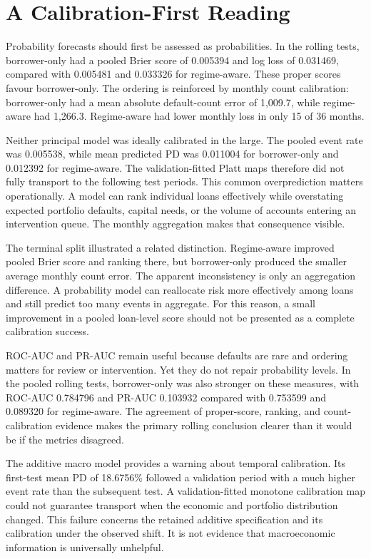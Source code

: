 \section{A Calibration-First Reading}

Probability forecasts should first be assessed as probabilities. In the rolling tests, borrower-only had a pooled Brier score of 0.005394 and log loss of 0.031469, compared with 0.005481 and 0.033326 for regime-aware. These proper scores favour borrower-only. The ordering is reinforced by monthly count calibration: borrower-only had a mean absolute default-count error of 1,009.7, while regime-aware had 1,266.3. Regime-aware had lower monthly loss in only 15 of 36 months.

Neither principal model was ideally calibrated in the large. The pooled event rate was 0.005538, while mean predicted PD was 0.011004 for borrower-only and 0.012392 for regime-aware. The validation-fitted Platt maps therefore did not fully transport to the following test periods. This common overprediction matters operationally. A model can rank individual loans effectively while overstating expected portfolio defaults, capital needs, or the volume of accounts entering an intervention queue. The monthly aggregation makes that consequence visible.

The terminal split illustrated a related distinction. Regime-aware improved pooled Brier score and ranking there, but borrower-only produced the smaller average monthly count error. The apparent inconsistency is only an aggregation difference. A probability model can reallocate risk more effectively among loans and still predict too many events in aggregate. For this reason, a small improvement in a pooled loan-level score should not be presented as a complete calibration success.

ROC-AUC and PR-AUC remain useful because defaults are rare and ordering matters for review or intervention. Yet they do not repair probability levels. In the pooled rolling tests, borrower-only was also stronger on these measures, with ROC-AUC 0.784796 and PR-AUC 0.103932 compared with 0.753599 and 0.089320 for regime-aware. The agreement of proper-score, ranking, and count-calibration evidence makes the primary rolling conclusion clearer than it would be if the metrics disagreed.

The additive macro model provides a warning about temporal calibration. Its first-test mean PD of 18.6756\% followed a validation period with a much higher event rate than the subsequent test. A validation-fitted monotone calibration map could not guarantee transport when the economic and portfolio distribution changed. This failure concerns the retained additive specification and its calibration under the observed shift. It is not evidence that macroeconomic information is universally unhelpful.

